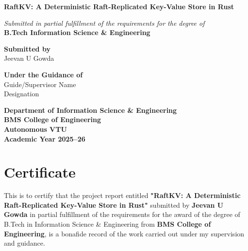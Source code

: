 \documentclass[12pt,a4paper]{report}
\begin{document}
\begin{titlepage}
    \begin{center}
        \vspace*{1cm}
        
        \Large
        \textbf{RaftKV: A Deterministic Raft-Replicated Key-Value Store in Rust}
        
        \vspace{1.5cm}
        
        \normalsize
        \textit{Submitted in partial fulfillment of the requirements for the degree of}\\
        \textbf{B.Tech Information Science \& Engineering}
        
        \vspace{1.5cm}
        
        \textbf{Submitted by}\\
        Jeevan U Gowda\\
        
        \vspace{1.5cm}
        
        \textbf{Under the Guidance of}\\
        Guide/Supervisor Name\\
        Designation\\
        
        \vfill
        
        \vspace{1cm}
        
        \textbf{Department of Information Science \& Engineering}\\
        \textbf{BMS College of Engineering}\\
        \textbf{Autonomous VTU}\\
        \textbf{Academic Year 2025--26}
        
    \end{center}
\end{titlepage}


\chapter*{Certificate}
This is to certify that the project report entitled \textbf{"RaftKV: A Deterministic Raft-Replicated Key-Value Store in Rust"} submitted by \textbf{Jeevan U Gowda} in partial fulfillment of the requirements for the award of the degree of B.Tech in Information Science \& Engineering from \textbf{BMS College of Engineering}, is a bonafide record of the work carried out under my supervision and guidance.
\end{document}
